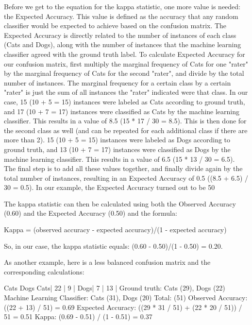 Before we get to the equation for the kappa statistic, one more value is needed: the Expected Accuracy. This value is defined as the accuracy that any random classifier would be expected to achieve based on the confusion matrix. The Expected Accuracy is directly related to the number of instances of each class (Cats and Dogs), along with the number of instances that the machine learning classifier agreed with the ground truth label. To calculate Expected Accuracy for our confusion matrix, first multiply the marginal frequency of Cats for one "rater" by the marginal frequency of Cats for the second "rater", and divide by the total number of instances. The marginal frequency for a certain class by a certain "rater" is just the sum of all instances the "rater" indicated were that class. In our case, 15 (10 + 5 = 15) instances were labeled as Cats according to ground truth, and 17 (10 + 7 = 17) instances were classified as Cats by the machine learning classifier. This results in a value of 8.5 (15 * 17 / 30 = 8.5). This is then done for the second class as well (and can be repeated for each additional class if there are more than 2). 15 (10 + 5 = 15) instances were labeled as Dogs according to ground truth, and 13 (10 + 7 = 17) instances were classified as Dogs by the machine learning classifier. This results in a value of 6.5 (15 * 13 / 30 = 6.5). The final step is to add all these values together, and finally divide again by the total number of instances, resulting in an Expected Accuracy of 0.5 ((8.5 + 6.5) / 30 = 0.5). In our example, the Expected Accuracy turned out to be 50%

The kappa statistic can then be calculated using both the Observed Accuracy (0.60) and the Expected Accuracy (0.50) and the formula:

Kappa = (observed accuracy - expected accuracy)/(1 - expected accuracy)


So, in our case, the kappa statistic equals: (0.60 - 0.50)/(1 - 0.50) = 0.20.

As another example, here is a less balanced confusion matrix and the corresponding calculations:

     Cats Dogs
Cats| 22 | 9  |
Dogs| 7  | 13 |
Ground truth: Cats (29), Dogs (22) 
Machine Learning Classifier: Cats (31), Dogs (20) 
Total: (51) 
Observed Accuracy: ((22 + 13) / 51) = 0.69 
Expected Accuracy: ((29 * 31 / 51) + (22 * 20 / 51)) / 51 = 0.51 
Kappa: (0.69 - 0.51) / (1 - 0.51) = 0.37

